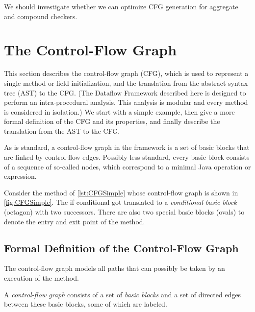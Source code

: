 \begin{workinprogress}
We should investigate whether we can optimize CFG generation for
aggregate and compound checkers.
\end{workinprogress}


\section{The Control-Flow Graph}
\label{sec:cfg}


This section describes the control-flow graph (CFG), which is used to
represent a single method or field initialization, and the translation
from the abstract syntax tree (AST) to the CFG\@.  (The Dataflow
Framework described here is designed to perform an intra-procedural
analysis.  This analysis is modular and every method is considered in
isolation.)  We start with a simple example, then give a more formal
definition of the CFG and its properties, and finally describe the
translation from the AST to the CFG.

As is standard, a control-flow graph in the framework is a set of
basic blocks that are linked by control-flow edges. Possibly less
standard, every basic block consists of a sequence of so-called nodes,
which correspond to a minimal Java operation or expression.



Consider the method  of \autoref{lst:CFGSimple} whose
control-flow graph is shown in \autoref{fig:CFGSimple}. The if
conditional got translated to a \emph{conditional basic block}
(octagon) with two successors. There are also two special basic blocks
(ovals) to denote the entry and exit point of the method.


\subsection{Formal Definition of the Control-Flow Graph}
\label{sec:cfg-formal}

The control-flow graph models all paths that can possibly be taken by an
execution of the method.

\begin{definition}
    A \emph{control-flow graph} consists of a set of \emph{basic
      blocks} and a set of directed edges between these basic blocks,
    some of which are labeled.
\end{definition}

